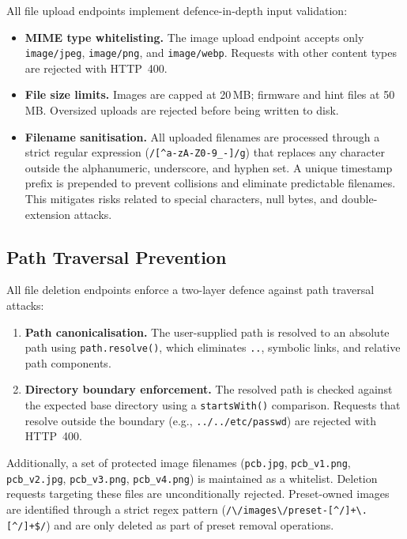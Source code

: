 All file upload endpoints implement defence-in-depth input validation:

\begin{itemize}
    \item \textbf{MIME type whitelisting.} The image upload endpoint accepts only \texttt{image/jpeg}, \texttt{image/png}, and \texttt{image/webp}. Requests with other content types are rejected with HTTP~400.
    \item \textbf{File size limits.} Images are capped at 20\,MB; firmware and hint files at 50\,MB. Oversized uploads are rejected before being written to disk.
    \item \textbf{Filename sanitisation.} All uploaded filenames are processed through a strict regular expression (\texttt{/[\^{}a-zA-Z0-9\_-]/g}) that replaces any character outside the alphanumeric, underscore, and hyphen set. A unique timestamp prefix is prepended to prevent collisions and eliminate predictable filenames. This mitigates risks related to special characters, null bytes, and double-extension attacks.
\end{itemize}

\subsection{Path Traversal Prevention}\label{subsec:sec-traversal}

All file deletion endpoints enforce a two-layer defence against path traversal attacks:

\begin{enumerate}
    \item \textbf{Path canonicalisation.} The user-supplied path is resolved to an absolute path using \texttt{path.resolve()}, which eliminates \texttt{..}, symbolic links, and relative path components.
    \item \textbf{Directory boundary enforcement.} The resolved path is checked against the expected base directory using a \texttt{startsWith()} comparison. Requests that resolve outside the boundary (e.g., \texttt{../../etc/passwd}) are rejected with HTTP~400.
\end{enumerate}

Additionally, a set of protected image filenames (\texttt{pcb.jpg}, \texttt{pcb\_v1.png}, \texttt{pcb\_v2.jpg}, \texttt{pcb\_v3.png}, \texttt{pcb\_v4.png}) is maintained as a whitelist. Deletion requests targeting these files are unconditionally rejected. Preset-owned images are identified through a strict regex pattern (\texttt{/\textbackslash/images\textbackslash/preset-[\^{}/]+\textbackslash.[\^{}/]+\$/}) and are only deleted as part of preset removal operations.

